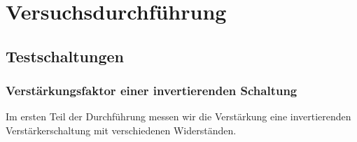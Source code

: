 \chapter{Versuchsdurchführung}
\section{Testschaltungen}
\subsection{Verstärkungsfaktor einer invertierenden Schaltung}
Im ersten Teil der Durchführung messen wir die Verstärkung eine
invertierenden Verstärkerschaltung mit verschiedenen Widerständen.

